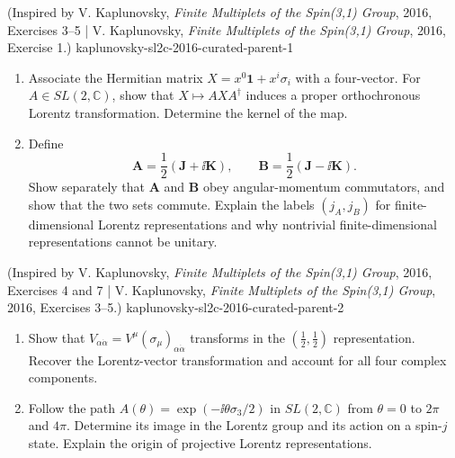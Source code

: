 \begin{enumerate}
  {(Inspired by V. Kaplunovsky, \emph{Finite Multiplets of the Spin(3,1) Group}, 2016, Exercises 3--5 | V. Kaplunovsky, \emph{Finite Multiplets of the Spin(3,1) Group}, 2016, Exercise 1.)}
  {kaplunovsky-sl2c-2016-curated-parent-1}
\begin{enumerate}
\item
Associate the Hermitian matrix \(X=x^0\mathbf{1}+x^i\sigma_i\) with a
four-vector.  For \(A\in SL(2,\mathbb C)\), show that
\(X\mapsto AXA^\dagger\) induces a proper orthochronous Lorentz
transformation.  Determine the kernel of the map.
\item
Define
\[
 \mathbf A=\frac12(\mathbf J+\ii\mathbf K),\qquad
 \mathbf B=\frac12(\mathbf J-\ii\mathbf K).
\]
Show separately that \(\mathbf A\) and \(\mathbf B\) obey angular-momentum
commutators, and show that the two sets commute.  Explain the labels
\((j_A,j_B)\) for finite-dimensional Lorentz representations and why
nontrivial finite-dimensional representations cannot be unitary.
\end{enumerate}

  {(Inspired by V. Kaplunovsky, \emph{Finite Multiplets of the Spin(3,1) Group}, 2016, Exercises 4 and 7 | V. Kaplunovsky, \emph{Finite Multiplets of the Spin(3,1) Group}, 2016, Exercises 3--5.)}
  {kaplunovsky-sl2c-2016-curated-parent-2}
\begin{enumerate}
\item
Show that \(V_{\alpha\dot\alpha}=V^\mu(\sigma_\mu)_{\alpha\dot\alpha}\)
transforms in the \((\frac12,\frac12)\) representation.  Recover the
Lorentz-vector transformation and account for all four complex
components.
\item
Follow the path \(A(\theta)=\exp(-\ii\theta\sigma_3/2)\) in
\(SL(2,\mathbb C)\) from \(\theta=0\) to \(2\pi\) and \(4\pi\).  Determine
its image in the Lorentz group and its action on a spin-\(j\) state.
Explain the origin of projective Lorentz representations.
\end{enumerate}


\end{enumerate}
